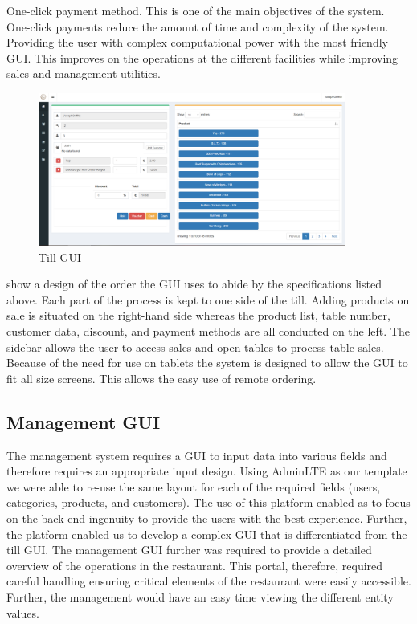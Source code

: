 \newline
\newline
One-click payment method. This is one of the main objectives of the system. One-click payments reduce the amount of time and complexity of the system. Providing the user with complex computational power with the most friendly GUI. This improves on the operations at the different facilities while improving sales and management utilities. 
\begin{figure}[h!]
	\caption{Till GUI}
	\label{image:myImageName}
	\centering
	\includegraphics[width=0.9\textwidth]{Fig images/tillGUI.PNG}
\end{figure}

show a design of the order the GUI uses to abide by the specifications listed above. Each part of the process is kept to one side of the till. Adding products on sale is situated on the right-hand side whereas the product list, table number, customer data, discount, and payment methods are all conducted on the left.
\newline
\newline
The sidebar allows the user to access sales and open tables to process table sales. Because of the need for use on tablets the system is designed to allow the GUI to fit all size screens. This allows the easy use of remote ordering.

\subsection{Management GUI}

The management system requires a GUI to input data into various fields and therefore requires an appropriate input design. Using AdminLTE as our template we were able to re-use the same layout for each of the required fields (users, categories, products, and customers). The use of this platform enabled as to focus on the back-end ingenuity to provide the users with the best experience. Further, the platform enabled us to develop a complex GUI that is differentiated from the till GUI. The management GUI further was required to provide a detailed overview of the operations in the restaurant. This portal, therefore, required careful handling ensuring critical elements of the restaurant were easily accessible. Further, the management would have an easy time viewing the different entity values. 
\newline
\newline

